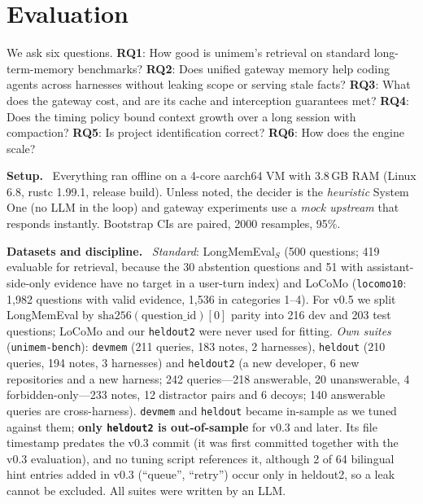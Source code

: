\documentclass[10pt,twocolumn]{article}
\newcommand{\sys}{\textsf{unimem}}
\newcommand{\code}[1]{\texttt{\small #1}}
\newcommand{\para}[1]{\smallskip\noindent\textbf{#1}\ }
\newcommand{\RQ}[1]{\textbf{RQ#1}}
\begin{document}
\section{Evaluation}
\label{sec:eval}

We ask six questions.
\RQ1: How good is \sys{}'s retrieval on standard long-term-memory benchmarks?
\RQ2: Does unified gateway memory help coding agents across harnesses without leaking scope or serving stale facts?
\RQ3: What does the gateway cost, and are its cache and interception guarantees met?
\RQ4: Does the timing policy bound context growth over a long session with compaction?
\RQ5: Is project identification correct?
\RQ6: How does the engine scale?

\para{Setup.} Everything ran offline on a 4-core aarch64 VM with 3.8\,GB RAM (Linux 6.8, rustc 1.99.1, release
build). Unless noted, the decider is the \emph{heuristic} System One (no LLM in the loop) and gateway experiments use a
\emph{mock upstream} that responds instantly. Bootstrap CIs are paired, 2000 resamples, 95\%.

\para{Datasets and discipline.} \emph{Standard}: LongMemEval$_S$ (500 questions; 419 evaluable for retrieval, because
the 30 abstention questions and 51 with assistant-side-only evidence have no target in a user-turn index) and LoCoMo
(\code{locomo10}: 1,982 questions with valid evidence, 1,536 in categories 1--4). For v0.5 we split LongMemEval by
$\text{sha256}(\text{question\_id})[0]$ parity into 216 dev and 203 test questions; LoCoMo and our \code{heldout2} were
never used for fitting. \emph{Own suites} (\code{unimem-bench}): \code{devmem} (211 queries, 183 notes, 2
harnesses), \code{heldout} (210 queries, 194 notes, 3 harnesses) and \code{heldout2} (a new developer, 6 new repositories
and a new harness; 242 queries---218 answerable, 20 unanswerable, 4 forbidden-only---233 notes, 12 distractor pairs and
6 decoys; 140 answerable queries are cross-harness). \code{devmem} and \code{heldout} became in-sample as we tuned
against them; \textbf{only \code{heldout2} is out-of-sample} for v0.3 and later. Its file timestamp predates the v0.3 commit (it was first
committed together with the v0.3 evaluation), and no tuning script references it, although 2 of 64 bilingual hint entries added in v0.3 (``queue'', ``retry'') occur
only in heldout2, so a leak cannot be excluded. All suites were written by an LLM.

\end{document}

